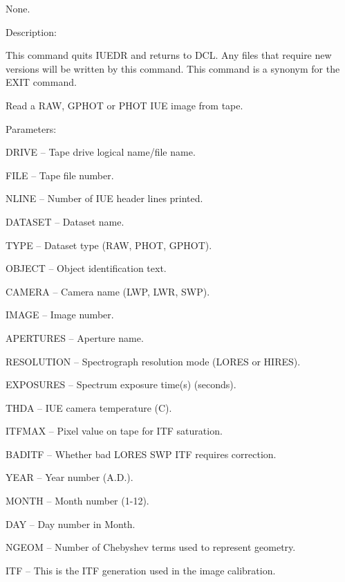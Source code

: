\begin {description}
\begin {description}
\begin {description}
\item None.
\end {description}

\item Description:

This command quits IUEDR and returns to DCL.
Any files that require new versions will be written by this
command.
This command is a synonym for the EXIT command.
\end {description}

\item [READIUE]
Read a RAW, GPHOT or PHOT IUE image from tape.

\begin {description}
\item Parameters:

\begin {description}
\item DRIVE -- Tape drive logical name/file name.
\item FILE -- Tape file number.
\item NLINE -- Number of IUE header lines printed.
\item DATASET -- Dataset name.
\item TYPE -- Dataset type (RAW, PHOT, GPHOT).
\item OBJECT -- Object identification text.
\item CAMERA -- Camera name (LWP, LWR, SWP).
\item IMAGE -- Image number.
\item APERTURES -- Aperture name.
\item RESOLUTION -- Spectrograph resolution mode (LORES or HIRES).
\item EXPOSURES -- Spectrum exposure time(s) (seconds).
\item THDA -- IUE camera temperature (C).
\item ITFMAX -- Pixel value on tape for ITF saturation.
\item BADITF -- Whether bad LORES SWP ITF requires correction.
\item YEAR -- Year number (A.D.).
\item MONTH -- Month number (1-12).
\item DAY -- Day number in Month.
\item NGEOM -- Number of Chebyshev terms used to represent geometry.
\item ITF -- This is the ITF generation used in the image calibration.
\end {description}


\end{description}
\end{description}
